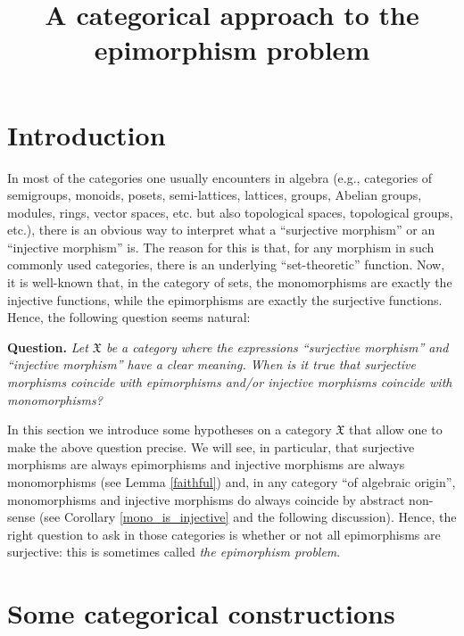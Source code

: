 \documentclass[12pt]{article}
\title{A categorical approach to the epimorphism problem}
\author{}
\theoremstyle{definition}
\def\X{\mathfrak X}
\numberwithin{equation}{section}
\begin{document}
\maketitle


\setcounter{tocdepth}{3}
\tableofcontents


\section*{Introduction}\label{Background}

In most of the categories one usually encounters in algebra (e.g., categories of semigroups, monoids, posets, semi-lattices, lattices, groups, Abelian groups, modules, rings, vector spaces, etc. but also topological spaces, topological groups, etc.), there is an obvious way to interpret what a ``surjective morphism'' or an ``injective morphism'' is. The reason for this is that, for any morphism in such commonly used categories, there is an underlying ``set-theoretic'' function. Now, it is well-known that, in the category of sets, the monomorphisms are exactly the injective functions, while the epimorphisms are exactly the surjective functions. Hence, the following question seems natural:

\bigskip\noindent
{\bf Question. }{\em
Let $\X$ be a category where the expressions ``surjective morphism'' and ``injective morphism'' have a clear meaning. When is it true that surjective morphisms coincide with epimorphisms and/or injective morphisms coincide with monomorphisms?}

\medskip
In this section we introduce some hypotheses on a category $\X$ that allow one to make the above question precise. We will see, in particular, that surjective morphisms are always epimorphisms and injective morphisms are always monomorphisms (see Lemma \ref{faithful}) and, in any category ``of algebraic origin'', monomorphisms and injective morphisms do always coincide by abstract non-sense (see Corollary \ref{mono_is_injective} and the following discussion). Hence, the right question to ask in those categories is whether or not all epimorphisms are surjective: this is sometimes called {\em the epimorphism problem}. 
 

\section{Some categorical constructions}
\end{document}
